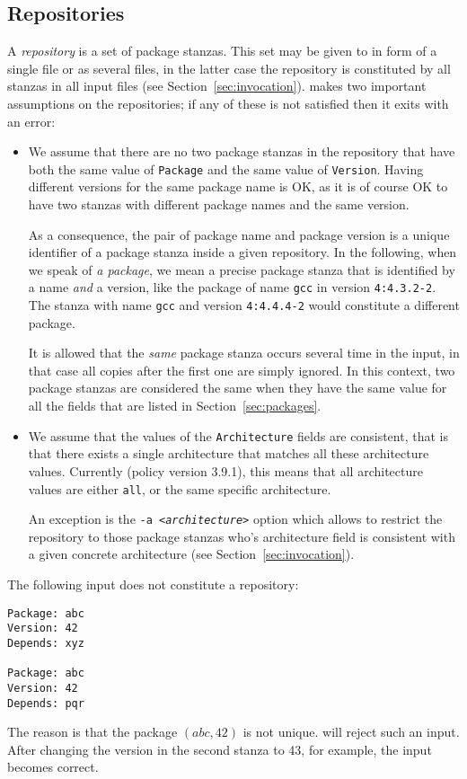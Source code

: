 \subsection{Repositories}
\label{sec:repositories}
A \emph{repository} is a set of package stanzas. This set may be given
to \debcheck{} in form of a single file or as several files, in the
latter case the repository is constituted by all stanzas in all input
files (see Section~\ref{sec:invocation}). \debcheck{} makes two
important assumptions on the repositories; if any of these is not
satisfied then it exits with an error:

\begin{itemize}
\item
  We assume that there are no two package stanzas in the repository
  that have both the same value of \texttt{Package} and the same value
  of \texttt{Version}. Having different versions for the same package
  name is OK, as it is of course OK to have two stanzas with different
  package names and the same version.

  As a consequence, the pair of package name and package version is a
  unique identifier of a package stanza inside a given repository. In
  the following, when we speak of \emph{a package}, we mean a precise
  package stanza that is identified by a name \emph{and} a version,
  like the package of name \texttt{gcc} in version \texttt{4:4.3.2-2}.
  The stanza with name \texttt{gcc} and version \texttt{4:4.4.4-2}
  would constitute a different package.

  It is allowed that the \emph{same} package stanza occurs several
  time in the input, in that case all copies after the first one are
  simply ignored. In this context, two package stanzas are considered
  the same when they have the same value for all the fields that are
  listed in Section~\ref{sec:packages}.
\item
  We assume that the values of the \texttt{Architecture} fields are
  consistent, that is that there exists a single architecture that
  matches all these architecture values. Currently (policy version
  3.9.1), this means that all architecture values are either
  \texttt{all}, or the same specific architecture.

  An exception is the \texttt{-a \textit{<architecture>}} option which
  allows to restrict the repository to those package stanzas who's
  architecture field is consistent with a given concrete architecture
  (see Section~\ref{sec:invocation}).
\end{itemize}

\begin{example} The following input does not constitute a repository:
\begin{verbatim}
Package: abc
Version: 42
Depends: xyz

Package: abc
Version: 42
Depends: pqr
\end{verbatim}
The reason is that the package $(abc,42)$ is not unique. \debcheck{}
will reject such an input. After changing the version in the second
stanza to 43, for example, the input becomes correct.
\end{example}


